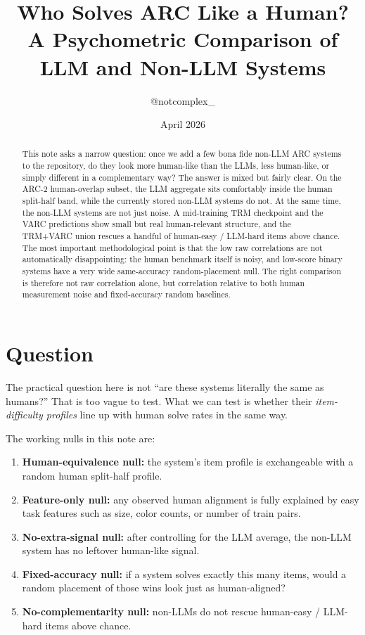 \documentclass[11pt,letterpaper]{article}
\title{\textbf{Who Solves ARC Like a Human?}\\
\large A Psychometric Comparison of LLM and Non-LLM Systems}
\author{@notcomplex\_}
\date{April 2026}
\begin{document}
\maketitle

\begin{abstract}
This note asks a narrow question: once we add a few bona fide non-LLM ARC systems to the repository, do they look more human-like than the LLMs, less human-like, or simply different in a complementary way? The answer is mixed but fairly clear. On the ARC-2 human-overlap subset, the LLM aggregate sits comfortably inside the human split-half band, while the currently stored non-LLM systems do not. At the same time, the non-LLM systems are not just noise. A mid-training TRM checkpoint and the VARC predictions show small but real human-relevant structure, and the TRM+VARC union rescues a handful of human-easy / LLM-hard items above chance. The most important methodological point is that the low raw correlations are not automatically disappointing: the human benchmark itself is noisy, and low-score binary systems have a very wide same-accuracy random-placement null. The right comparison is therefore not raw correlation alone, but correlation relative to both human measurement noise and fixed-accuracy random baselines.
\end{abstract}

\section{Question}

The practical question here is not ``are these systems literally the same as humans?'' That is too vague to test. What we can test is whether their \emph{item-difficulty profiles} line up with human solve rates in the same way.

The working nulls in this note are:

\begin{enumerate}
    \item \textbf{Human-equivalence null:} the system's item profile is exchangeable with a random human split-half profile.
    \item \textbf{Feature-only null:} any observed human alignment is fully explained by easy task features such as size, color counts, or number of train pairs.
    \item \textbf{No-extra-signal null:} after controlling for the LLM average, the non-LLM system has no leftover human-like signal.
    \item \textbf{Fixed-accuracy null:} if a system solves exactly this many items, would a random placement of those wins look just as human-aligned?
    \item \textbf{No-complementarity null:} non-LLMs do not rescue human-easy / LLM-hard items above chance.
\end{enumerate}
\end{document}
